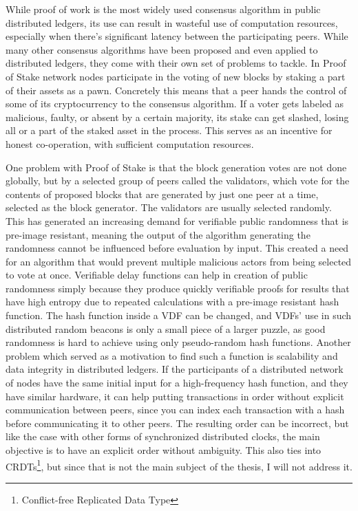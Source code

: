 While proof of work is the most widely used consensus algorithm in public distributed ledgers, its use can result in wasteful use of computation resources, especially when there's significant latency between the participating peers. While many other consensus algorithms have been proposed and even applied to distributed ledgers, they come with their own set of problems to tackle. In Proof of Stake network nodes participate in the voting of new blocks by staking a part of their assets as a pawn. Concretely this means that a peer hands the control of some of its cryptocurrency to the consensus algorithm. If a voter gets labeled as malicious, faulty, or absent by a certain majority, its stake can get slashed, losing all or a part of the staked asset in the process. This serves as an incentive for honest co-operation, with sufficient computation resources.

One problem with Proof of Stake is that the block generation votes are not done globally, but by a selected group of peers called the validators, which vote for the contents of proposed blocks that are generated by just one peer at a time, selected as the block generator. The validators are usually selected randomly. This has generated an increasing demand for verifiable public randomness that is pre-image resistant, meaning the output of the algorithm generating the randomness cannot be influenced before evaluation by input. This created a need for an algorithm that would prevent multiple malicious actors from being selected to vote at once. Verifiable delay functions can help in creation of public randomness simply because they produce quickly verifiable proofs for results that have high entropy due to repeated calculations with a pre-image resistant hash function. The hash function inside a VDF can be changed, and VDFs' use in such distributed random beacons is only a small piece of a larger puzzle, as good randomness is hard to achieve using only pseudo-random hash functions. Another problem which served as a motivation to find such a function is scalability and data integrity in distributed ledgers. If the participants of a distributed network of nodes have the same initial input for a high-frequency hash function, and they have similar hardware, it can help putting transactions in order without explicit communication between peers, since you can index each transaction with a hash before communicating it to other peers. The resulting order can be incorrect, but like the case with other forms of synchronized distributed clocks, the main objective is to have an explicit order without ambiguity. This also ties into CRDTs\footnote{Conflict-free Replicated Data Type}, but since that is not the main subject of the thesis, I will not address it.

